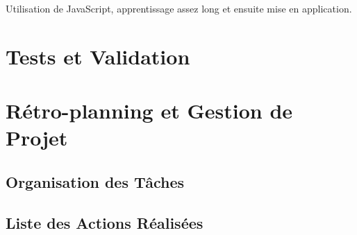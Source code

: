 \documentclass[a4paper,12pt]{report}  %
\begin{document}
Utilisation de JavaScript, apprentissage assez long et ensuite mise en application.

\section{Tests et Validation}

\section{Rétro-planning et Gestion de Projet}
\subsection{Organisation des Tâches}

\subsection{Liste des Actions Réalisées}
\end{document}
